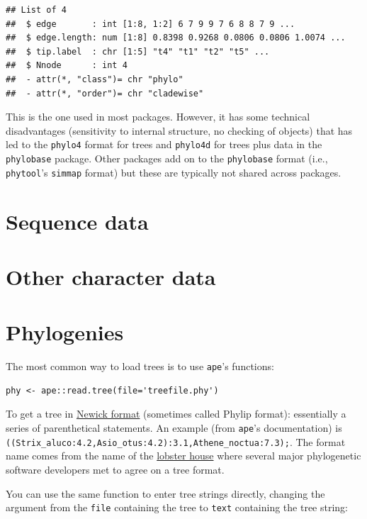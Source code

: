 \documentclass[]{book}
\theoremstyle{definition}
\theoremstyle{definition}
\theoremstyle{remark}
\begin{document}
\begin{verbatim}
## List of 4
##  $ edge       : int [1:8, 1:2] 6 7 9 9 7 6 8 8 7 9 ...
##  $ edge.length: num [1:8] 0.8398 0.9268 0.0806 0.0806 1.0074 ...
##  $ tip.label  : chr [1:5] "t4" "t1" "t2" "t5" ...
##  $ Nnode      : int 4
##  - attr(*, "class")= chr "phylo"
##  - attr(*, "order")= chr "cladewise"
\end{verbatim}

This is the one used in most packages. However, it has some technical
disadvantages (sensitivity to internal structure, no checking of
objects) that has led to the \texttt{phylo4} format for trees and
\texttt{phylo4d} for trees plus data in the \texttt{phylobase} package.
Other packages add on to the \texttt{phylobase} format (i.e.,
\texttt{phytool}'s \texttt{simmap} format) but these are typically not
shared across packages.

\section{Sequence data}\label{sequence-data}

\section{Other character data}\label{other-character-data}

\section{Phylogenies}\label{phylogenies}

The most common way to load trees is to use \texttt{ape}'s functions:

\begin{verbatim}
phy <- ape::read.tree(file='treefile.phy')
\end{verbatim}

To get a tree in
\href{http://evolution.genetics.washington.edu/phylip/newicktree.html}{Newick
format} (sometimes called Phylip format): essentially a series of
parenthetical statements. An example (from \texttt{ape}'s documentation)
is \texttt{((Strix\_aluco:4.2,Asio\_otus:4.2):3.1,Athene\_noctua:7.3);}.
The format name comes from the name of the
\href{http://newicks.com}{lobster house} where several major
phylogenetic software developers met to agree on a tree format.

You can use the same function to enter tree strings directly, changing
the argument from the \texttt{file} containing the tree to \texttt{text}
containing the tree string:
\end{document}

